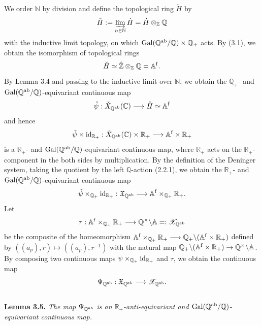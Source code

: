 \documentclass[12pt, leqno]{article}
\begin{document}
\par\medskip
\par\noindent
We order $\mathbb{N}$ by division and  define the topological ring $\check{H}$ by
$$ \check{H} := \varinjlim_{n \in \mathbb{N}} \dot{H} = \dot{H} \otimes_{\mathbb{Z}} \mathbb{Q}$$ 
with the inductive limit topology, on which $ {\rm Gal}(\mathbb{Q}^{\rm ab}/\mathbb{Q}) \times \mathbb{Q}_+$ acts. By (3.1), we obtain the isomorphism of topological rings 
$$ \check{H}  \simeq  \hat{\mathbb{Z}} \otimes_{\mathbb{Z}} \mathbb{Q} = \mathbb{A}^{\rm f}.$$
By Lemma 3.4 and passing to the inductive limit over $\mathbb{N}$, we obtain the $\mathbb{Q}_+$- and ${\rm Gal}(\mathbb{Q}^{\rm ab}/\mathbb{Q})$-equivariant continuous map
$$ \check{\psi} : \check{X}_{\mathbb{Q}^{\rm ab}}(\mathbb{C}) \longrightarrow \check{H} \simeq \mathbb{A}^{\rm f} $$
and hence
$$ \check{\psi} \times {\rm id}_{\mathbb{R}_+} : \check{X}_{\mathbb{Q}^{\rm ab}}(\mathbb{C}) \times \mathbb{R}_+ \longrightarrow \mathbb{A}^{\rm f}  \times \mathbb{R}_+ $$
is a $\mathbb{R}_+$- and ${\rm Gal}(\mathbb{Q}^{\rm ab}/\mathbb{Q})$-equivariant continuous map, where $\mathbb{R}_+$ acts on the $\mathbb{R}_+$-component in the both sides by multiplication.  By the definition of the Deninger system, taking the quotient by the left $\mathbb{Q}$-action (2.2.1), we obtain the $\mathbb{R}_+$- and ${\rm Gal}(\mathbb{Q}^{\rm ab}/\mathbb{Q})$-equivariant continuous map
$$ \check{\psi} \times_{\mathbb{Q_+}} {\rm id}_{\mathbb{R}_+} : \frak{X}_{\mathbb{Q}^{\rm ab}} \longrightarrow \mathbb{A}^{\rm f} \times_{\mathbb{Q}_+} \mathbb{R}_+. $$
Let 
$$ \tau : \mathbb{A}^{\rm f} \times_{\mathbb{Q}_+} \mathbb{R}_+ \longrightarrow \mathbb{Q}^{\times} \backslash \mathbb{A} = : \mathscr{X}_{\mathbb{Q}^{\rm ab}}$$
be the composite of the homeomorphism $ \mathbb{A}^{\rm f} \times_{\mathbb{Q}_+} \mathbb{R}_+ \longrightarrow \mathbb{Q}_+ \backslash (\mathbb{A}^{\rm f} \times \mathbb{R}_+)$ defined by $((a_p), r) \mapsto ((a_p), r^{-1})$ with the natural map $\mathbb{Q}_+ \backslash (\mathbb{A}^{\rm f} \times \mathbb{R}_+) \rightarrow \mathbb{Q}^{\times} \backslash \mathbb{A}$. By composing two continuous maps $\psi \times_{\mathbb{Q_+}} {\rm id}_{\mathbb{R}_+}$ and $\tau$, 
we obtain the continuous map
$$ \Psi_{\mathbb{Q}^{\rm ab}} : \frak{X}_{\mathbb{Q}^{\rm ab}}  \longrightarrow \mathscr{X}_{\mathbb{Q}^{\rm ab}}. $$
\\
{\bf Lemma 3.5.} {\it The map $\Psi_{\mathbb{Q}^{\rm ab}}$ is an $\mathbb{R}_+$-anti-equivariant and ${\rm Gal}(\mathbb{Q}^{\rm ab}/\mathbb{Q})$-equivariant continuous map.} 
\end{document}
